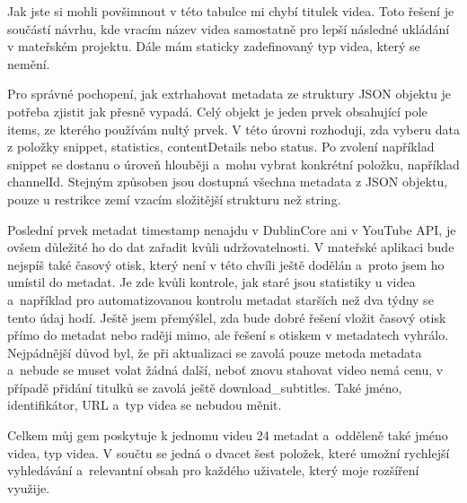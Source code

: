 \par Jak jste si mohli povšimnout v této tabulce mi chybí titulek videa. Toto řešení je součástí návrhu, kde vracím název videa samostatně pro lepší následné ukládání v mateřském projektu. Dále mám staticky zadefinovaný typ videa, který se nemění. 
\par Pro správné pochopení, jak extrhahovat metadata ze struktury JSON objektu je potřeba zjistit jak přesně vypadá. Celý objekt je jeden prvek obsahující pole items, ze kterého používám nultý prvek. V této úrovni rozhoduji, zda vyberu data z položky snippet, statistics, contentDetails nebo status. Po zvolení například snippet se dostanu o úroveň hlouběji a~mohu vybrat konkrétní položku, například channelId. Stejným způsoben jsou dostupná všechna metadata z JSON objektu, pouze u restrikce zemí vzacím složitější strukturu než string.
\par Poslední prvek metadat timestamp nenajdu v DublinCore ani v YouTube API, je ovšem důležité ho do dat zařadit kvůli udržovatelnosti. V mateřské aplikaci bude nejspíš také časový otisk, který není v této chvíli ještě dodělán a~proto jsem ho umístil do metadat. Je zde kvůli kontrole, jak staré jsou statistiky u videa a~například pro automatizovanou kontrolu metadat starších než dva týdny se tento údaj hodí. Ještě jsem přemýšlel, zda bude dobré řešení vložit časový otisk přímo do metadat nebo raději mimo, ale řešení s otiskem v metadatech vyhrálo. Nejpádnější důvod byl, že při aktualizaci se zavolá pouze metoda metadata a~nebude se muset volat žádná další, neboť znovu stahovat video nemá cenu, v případě přidání titulků se zavolá ještě download\_subtitles. Také jméno, identifikátor, URL a~typ videa se nebudou měnit.
\par Celkem můj gem poskytuje k jednomu videu 24 metadat a~odděleně také jméno videa, typ videa. V součtu se jedná o dvacet šest položek, které umožní rychlejší vyhledávání a~relevantní obsah pro každého uživatele, který moje rozšíření využije.

